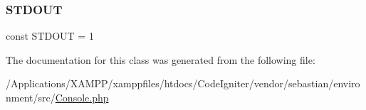 \subsubsection{\texorpdfstring{S\+T\+D\+O\+UT}{STDOUT}}
{\footnotesize\ttfamily const S\+T\+D\+O\+UT = 1}



The documentation for this class was generated from the following file\+:\begin{DoxyCompactItemize}
\item 
/\+Applications/\+X\+A\+M\+P\+P/xamppfiles/htdocs/\+Code\+Igniter/vendor/sebastian/environment/src/\mbox{\hyperlink{_console_8php}{Console.\+php}}\end{DoxyCompactItemize}

